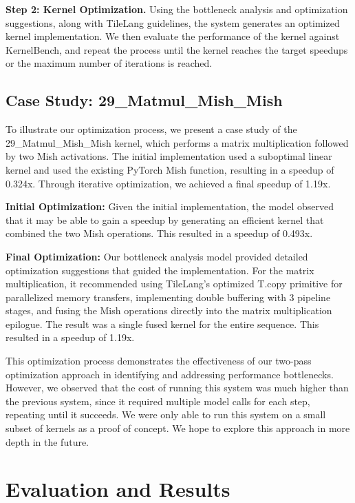 \documentclass{article}
\begin{document}
\textbf{Step 2: Kernel Optimization.} Using the bottleneck analysis and optimization suggestions, along with TileLang guidelines, the system generates an optimized kernel implementation. We then evaluate the performance of the kernel against KernelBench, and repeat the process until the kernel reaches the target speedups or the maximum number of iterations is reached.

\subsection{Case Study: 29\_Matmul\_Mish\_Mish}

To illustrate our optimization process, we present a case study of the 29\_Matmul\_Mish\_Mish kernel, which performs a matrix multiplication followed by two Mish activations. The initial implementation used a suboptimal linear kernel and used the existing PyTorch Mish function, resulting in a speedup of 0.324x. Through iterative optimization, we achieved a final speedup of 1.19x.

\textbf{Initial Optimization:} Given the initial implementation, the model observed that it may be able to gain a speedup by generating an efficient kernel that combined the two Mish operations. This resulted in a speedup of 0.493x.

\textbf{Final Optimization:} Our bottleneck analysis model provided detailed optimization suggestions that guided the implementation. For the matrix multiplication, it recommended using TileLang's optimized T.copy primitive for parallelized memory transfers, implementing double buffering with 3 pipeline stages, and fusing the Mish operations directly into the matrix multiplication epilogue. The result was a single fused kernel for the entire sequence. This resulted in a speedup of 1.19x.

This optimization process demonstrates the effectiveness of our two-pass optimization approach in identifying and addressing performance bottlenecks. However, we observed that the cost of running this system was much higher than the previous system, since it required multiple model calls for each step, repeating until it succeeds. We were only able to run this system on a small subset of kernels as a proof of concept. We hope to explore this approach in more depth in the future.

\section{Evaluation and Results}
\end{document}
